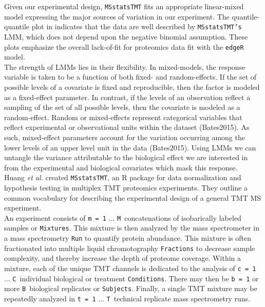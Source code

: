 \documentclass[12pt]{elife}\usepackage[]{graphicx}\usepackage[]{color}
\begin{document}
Given our experimental design, \texttt{MSstatsTMT} fits an
appropriate linear-mixed model expressing the major sources of variation in our
experiment.  The quantile-quantile plot in  indicates that the data are
well described by \texttt{MSstatsTMT's} LMM, which does not depend
upon the negative binomial assumption.  These plots emphasize the overall
lack-of-fit for proteomics data fit with the \texttt{edgeR} model.\\ 

The strength of LMMs lies in their flexibility. In mixed-models, the response
variable is taken to be a function of both fixed- and random-effects. 
If the set of possible levels of a covariate is fixed and reproducible, then the
factor is modeled as a fixed-effect parameter.  In contrast, if the levels of an
observation reflect a sampling of the set of all possible levels, then the
covariate is modeled as a random-effect.  Random or mixed-effects represent
categorical variables that reflect experimental or observational units within
the dataset (Bates2015).  As such, mixed-effect parameters account for the
variation occurring among the lower levels of an upper level unit in the data
(Bates2015).  Using LMMs we can untangle the variance attributable to the
biological effect we are interested in from the experimental and biological
covariates which mask this response.\\

Huang \textit{et al.} created \texttt{MSstatsTMT}, an R package for data
normalization and hypothesis testing in multiplex TMT proteomics experiments. 
They outline a common vocabulary for describing the experimental design of 
a general TMT MS experiment.\\

An experiment consists of \texttt{m = 1} ... \texttt{M}\ concatenations 
of isobarically labeled samples or \texttt{Mixtures}. 
This mixture is then analyzed by the mass spectrometer in a mass 
spectrometry \texttt{Run} to quantify protein abundance. This mixture is often
fractionated into multiple liquid chromotography \texttt{Fractions} to decrease
sample complexity, and thereby increase the depth of proteome coverage. 
Within a mixture, each of the unique TMT channels is dedicated to the 
analysis of \texttt{c = 1} ... \texttt{C}\ individual biological or treatment 
\texttt{Conditions}.  There may then be \texttt{b = 1} or more \texttt{B}\ 
biological replicates or \texttt{Subjects}. Finally, a single TMT mixture may be 
repeatedly analyzed in \texttt{t = 1} ... \texttt{T}\ technical replicate mass 
spectrometry runs.\\
\end{document}
